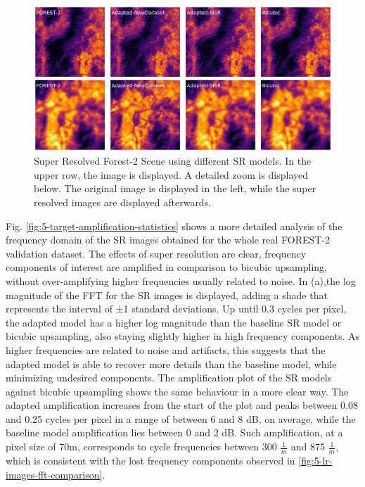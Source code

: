         \begin{figure}[H]
            \centering
            \includegraphics[scale=0.28]{Includes/5-target_prediction_sample.pdf}
            \caption{Super Resolved Forest-2 Scene using different SR models.
                     In the upper row, the image is displayed. A detailed zoom is displayed below. The original image is displayed in the left, while the super resolved images are displayed afterwards.
                    }
            \label{fig:5-target_prediction_sample}
        \end{figure}

        Fig. \ref{fig:5-target-amplification-statistics} shows a more detailed analysis of the frequency domain of the SR images obtained for the whole real FOREST-2 validation dataset.
        The effects of super resolution are clear, frequency components of interest are amplified in comparison to bicubic upsampling, without over-amplifying higher frequencies usually related to noise.  In (a),the log magnitude of the FFT for the SR images is displayed, adding a shade that represents the interval of ±1 standard deviations. 
        Up until 0.3 cycles per pixel, the adapted model has a higher log magnitude than the baseline SR model or bicubic upsampling, also staying slightly higher in high frequency components.
        As higher frequencies are related to noise and artifacts, this suggests that the adapted model is able to recover more details than the baseline model, while minimizing undesired components.
        The amplification plot of the SR models against bicubic upsampling shows the same behaviour in a more clear way. 
        The adapted amplification increases from the start of the plot and peaks between 0.08 and 0.25 cycles per pixel in a range of between 6 and 8 dB, on average, while the baseline model amplification lies between 0 and 2 dB.
        Such amplification, at a pixel size of 70m, corresponds to cycle frequencies between  300 $\frac{1}{m}$ and 875 $\frac{1}{m}$, which is consistent with the lost frequency components observed in \ref{fig:5-lr-images-fft-comparison}.
        
